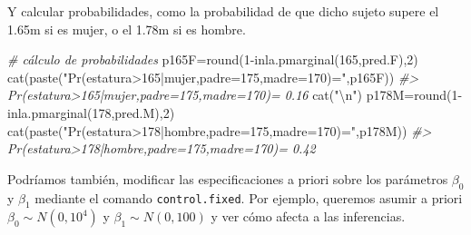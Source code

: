 \documentclass[
]{book}
\newenvironment{Shaded}{\begin{snugshade}}{\end{snugshade}}
\newcommand{\AttributeTok}[1]{\textcolor[rgb]{0.77,0.63,0.00}{#1}}
\newcommand{\CommentTok}[1]{\textcolor[rgb]{0.56,0.35,0.01}{\textit{#1}}}
\newcommand{\DecValTok}[1]{\textcolor[rgb]{0.00,0.00,0.81}{#1}}
\newcommand{\FloatTok}[1]{\textcolor[rgb]{0.00,0.00,0.81}{#1}}
\newcommand{\FunctionTok}[1]{\textcolor[rgb]{0.00,0.00,0.00}{#1}}
\newcommand{\NormalTok}[1]{#1}
\newcommand{\OtherTok}[1]{\textcolor[rgb]{0.56,0.35,0.01}{#1}}
\newcommand{\SpecialCharTok}[1]{\textcolor[rgb]{0.00,0.00,0.00}{#1}}
\newcommand{\StringTok}[1]{\textcolor[rgb]{0.31,0.60,0.02}{#1}}
\begin{document}
Y calcular probabilidades, como la probabilidad de que dicho sujeto supere el 1.65m si es mujer, o el 1.78m si es hombre.

\begin{Shaded}
\begin{Highlighting}[]
\CommentTok{\# cálculo de probabilidades}
\NormalTok{p165F}\OtherTok{=}\FunctionTok{round}\NormalTok{(}\DecValTok{1}\SpecialCharTok{{-}}\FunctionTok{inla.pmarginal}\NormalTok{(}\DecValTok{165}\NormalTok{,pred.F),}\DecValTok{2}\NormalTok{)}
\FunctionTok{cat}\NormalTok{(}\FunctionTok{paste}\NormalTok{(}\StringTok{"Pr(estatura\textgreater{}165|mujer,padre=175,madre=170)="}\NormalTok{,p165F))}
\CommentTok{\#\textgreater{} Pr(estatura\textgreater{}165|mujer,padre=175,madre=170)= 0.16}
\FunctionTok{cat}\NormalTok{(}\StringTok{"}\SpecialCharTok{\textbackslash{}n}\StringTok{"}\NormalTok{)}
\NormalTok{p178M}\OtherTok{=}\FunctionTok{round}\NormalTok{(}\DecValTok{1}\SpecialCharTok{{-}}\FunctionTok{inla.pmarginal}\NormalTok{(}\DecValTok{178}\NormalTok{,pred.M),}\DecValTok{2}\NormalTok{)}
\FunctionTok{cat}\NormalTok{(}\FunctionTok{paste}\NormalTok{(}\StringTok{"Pr(estatura\textgreater{}178|hombre,padre=175,madre=170)="}\NormalTok{,p178M))}
\CommentTok{\#\textgreater{} Pr(estatura\textgreater{}178|hombre,padre=175,madre=170)= 0.42}
\end{Highlighting}
\end{Shaded}

Podríamos también, modificar las especificaciones a priori sobre los parámetros \(\beta_0\) y \(\beta_1\) mediante el comando \texttt{control.fixed}. Por ejemplo, queremos asumir a priori \(\beta_0\sim N(0,10^4)\) y \(\beta_1\sim N(0,100)\) y ver cómo afecta a las inferencias.

\begin{Shaded}
\end{Shaded}
\end{document}
